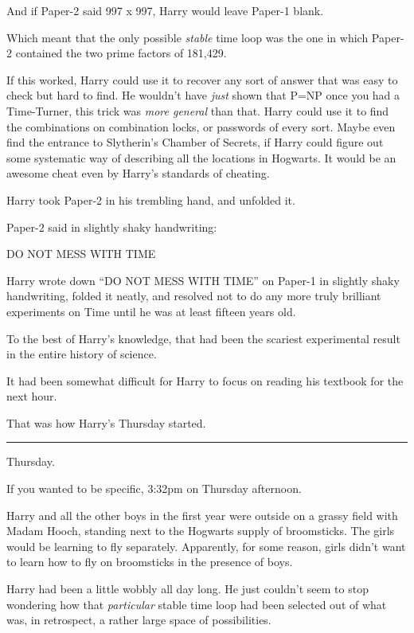 And if Paper-2 said 997 x 997, Harry would leave Paper-1 blank.

Which meant that the only possible \emph{stable} time loop was the one
in which Paper-2 contained the two prime factors of 181,429.

If this worked, Harry could use it to recover any sort of answer that
was easy to check but hard to find. He wouldn't have \emph{just} shown
that P=NP once you had a Time-Turner, this trick was \emph{more general}
than that. Harry could use it to find the combinations on combination
locks, or passwords of every sort. Maybe even find the entrance to
Slytherin's Chamber of Secrets, if Harry could figure out some
systematic way of describing all the locations in Hogwarts. It would be
an awesome cheat even by Harry's standards of cheating.

Harry took Paper-2 in his trembling hand, and unfolded it.

Paper-2 said in slightly shaky handwriting:

DO NOT MESS WITH TIME

Harry wrote down ``DO NOT MESS WITH TIME'' on Paper-1 in slightly shaky
handwriting, folded it neatly, and resolved not to do any more truly
brilliant experiments on Time until he was at least fifteen years old.

To the best of Harry's knowledge, that had been the scariest
experimental result in the entire history of science.

It had been somewhat difficult for Harry to focus on reading his
textbook for the next hour.

That was how Harry's Thursday started.

\begin{center}\rule{3in}{0.4pt}\end{center}

Thursday.

If you wanted to be specific, 3:32pm on Thursday afternoon.

Harry and all the other boys in the first year were outside on a grassy
field with Madam Hooch, standing next to the Hogwarts supply of
broomsticks. The girls would be learning to fly separately. Apparently,
for some reason, girls didn't want to learn how to fly on broomsticks in
the presence of boys.

Harry had been a little wobbly all day long. He just couldn't seem to
stop wondering how that \emph{particular} stable time loop had been
selected out of what was, in retrospect, a rather large space of
possibilities.

